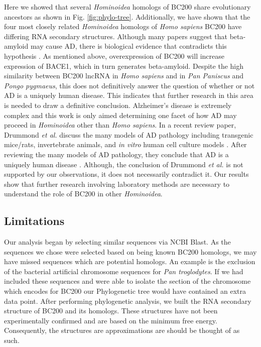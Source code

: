 \documentclass[conference, 11pt]{IEEEtran}
\begin{document}
Here we showed that several \emph{Hominoidea} homologs of BC200 share evolutionary ancestors as shown in Fig. \ref{fig:phylo-tree}. 
Additionally, we have shown that the four most closely related \emph{Hominoidea} homologs of \emph{Homo sapiens} BC200 have differing RNA secondary structures.
Although many papers suggest that beta-amyloid may cause AD, there is biological evidence that contradicts this hypothesis \cite{selkoe2016amyloid}.
As mentioned above, overexpression of BC200 will increase expression of BACE1, which in turn generates beta-amyloid. 
Despite the high similarity between BC200 lncRNA in \emph{Homo sapiens} and in \emph{Pan Paniscus} and \emph{Pongo pygmaeus}, this does not definitively answer the question of whether or not AD is a uniquely human disease.
This indicates that further research in this area is needed to draw a definitive conclusion. 
Alzheimer’s disease is extremely complex and this work is only aimed determining one facet of how AD may proceed in \emph{Hominoidea} other than \emph{Homo sapiens}. 
In a recent review paper, Drummond \emph{et al.} discuss the many models of AD pathology including transgenic mice/rats, invertebrate animals, and \emph{in vitro} human cell culture models \cite{drummond2017alzheimer}. 
After reviewing the many models of AD pathology, they conclude that AD is a uniquely human disease \cite{drummond2017alzheimer}. 
Although, the conclusion of Drummond \emph{et al.} is not supported by our observations, it does not necessarily contradict it. 
Our results show that further research involving laboratory methods are necessary to understand the role of BC200 in other \emph{Hominoidea}.

\subsection{Limitations}

Our analysis began by selecting similar sequences via NCBI Blast. 
As the sequences we chose were selected based on being known BC200 homologs, we may have missed sequences which are potential homologs. 
An example is the exclusion of the bacterial artificial chromosome sequences for \emph{Pan troglodytes}. 
If we had included these sequences and were able to isolate the section of the chromosome which encodes for BC200 our Phylogenetic tree would have contained an extra data point.
After performing phylogenetic analysis, we built the RNA secondary structure of BC200 and its homologs. 
These structures have not been experimentally confirmed and are based on the minimum free energy. 
Consequently, the structures are approximations are should be thought of as such.
\end{document}
